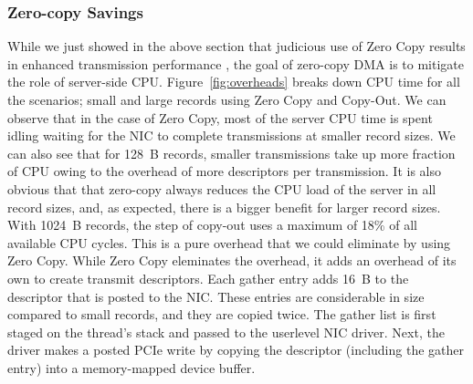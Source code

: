 

\subsubsection{Zero-copy Savings}
\label{sec:overhead}


While we just showed in the above section that judicious use of Zero Copy results in  enhanced transmission performance
, the goal of zero-copy DMA is to mitigate the role of server-side CPU. Figure~\ref{fig:overheads} breaks down
CPU time for all the scenarios; small and large records using Zero Copy and Copy-Out. We can observe that in the case 
of Zero Copy, most of the server CPU time is spent idling waiting for the NIC 
to complete transmissions at smaller record sizes. We can also see that for 128~B records,
smaller transmissions take up more fraction of CPU owing to the overhead of more descriptors
per transmission. It is also obvious that that zero-copy always reduces 
the CPU load of the server in all record sizes, and, as expected, there is a bigger
benefit for larger record sizes. 
With 1024~B records, the \memcpy  step of copy-out uses a maximum of 18\% of all available
CPU cycles. This is a pure overhead that we could eliminate by using Zero Copy.
While Zero Copy eleminates the \memcpy overhead, it adds an overhead of its own to create  transmit descriptors.
Each gather entry adds 16~B to the descriptor that is posted to the NIC.
These entries are considerable in size compared to
small records, and they are copied twice. The gather list
is first staged on the thread's stack and passed to the userlevel NIC driver. Next,
the driver makes a posted PCIe write by copying the descriptor (including the
gather entry) into a memory-mapped device buffer.




